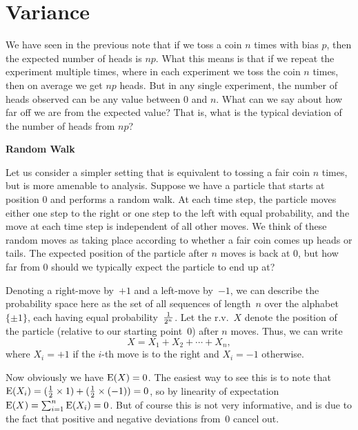 \documentclass[11pt]{article}
\def\half{{\textstyle{1\over 2}}}
\def\Ex#1{{\rm E}(#1)}
\begin{document}
\maketitle


\section*{Variance}

We have seen in the previous note that if we toss a coin $n$ times with bias $p$, then
the expected number of heads is $np$. What this means is that if we repeat the experiment multiple times, where
in each experiment we toss the coin $n$ times, then on average we get $np$ heads. But in any single experiment,
the number of heads observed can be any value between $0$ and $n$. What can we say about how far off we are
from the expected value? That is, what is the typical deviation of the number of heads from $np$?

\medskip

{\bf Random Walk}

\smallskip

Let us consider a simpler setting that is equivalent to tossing a fair coin $n$ times, but is more amenable
to analysis. Suppose we have a particle that starts at position $0$ and performs a random walk. At each time step,
the particle moves either one step to the right or one step to the left with equal probability, and the move at each
time step is independent of all other moves. We think of these random moves 
as taking place according to whether a fair coin comes up heads or tails. 
The expected position of the particle after $n$ moves is back at $0$, but
how far from $0$ should we typically expect the particle to end up at?

Denoting a right-move by~$+1$ and a left-move by~$-1$, we can describe
the probability space here as the set of all sequences of length~$n$ over
the alphabet $\{\pm 1\}$, each having equal probability~$1\over{2^n}$.
Let the r.v.~$X$ denote the position of the particle (relative to our starting point~0)
after $n$ moves.  Thus, we can write
\begin{equation}\label{eq:randomwalk}
X=X_1+X_2+\cdots +X_n,
\end{equation}
where $X_i=+1$ if the $i$-th move is to the right and $X_i = -1$ otherwise.

Now obviously we have $\Ex{X}=0$.  The easiest way to see this is to
note that $\Ex{X_i}=(\half\times 1)+(\half\times(-1))=0$, so by
linearity of expectation $\Ex{X}=\sum_{i=1}^n \Ex{X_i}=0$. But of course this is
not very informative, and is due to the fact that positive and
negative deviations from~0 cancel out.
\end{document}
